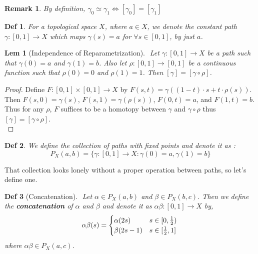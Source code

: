 \documentclass[paper=a4, fontsize=11pt]{scrartcl}
\newtheorem{definition}{Def}
\newtheorem{lemma}{Lem}
\newtheorem*{remark}{Remark}
\begin{document}
\begin{remark}
	By definition, $\gamma_0 \simeq \gamma_1 \iff [\gamma_0]=[\gamma_1]$\\
\end{remark}

\begin{definition}
	For a topological space $X$, where $a \in X$, we denote the constant path $\gamma:[0,1]\to X$ which maps $\gamma(s)=a$ for $\forall s \in [0,1]$, by just $a$.\\
\end{definition}

\begin{lemma}[Independence of Reparametrization] $ $\newline
	Let $\gamma:[0,1]\to X$ be a path such that $\gamma(0)=a$ and $\gamma(1)=b$. Also let $\rho:[0,1]\to [0,1]$ be a continuous function such that $\rho(0)=0$ and $\rho(1)=1$. Then $[\gamma]=[\gamma \circ \rho]$.\\
\end{lemma}

\begin{proof}
	Define $F:[0,1]\times[0,1] \to X$ by $F(s,t) = \gamma((1-t)\cdot s + t \cdot \rho(s))$. Then $F(s,0)=\gamma(s)$, $F(s,1)=\gamma(\rho(s))$, $F(0,t)=a$, and $F(1,t)=b$. Thus for any $\rho$, $F$ suffices to be a homotopy between $\gamma$ and $\gamma \circ \rho$ thus $[\gamma]=[\gamma \circ \rho]$.\\
\end{proof}

\begin{definition}
	We define the collection of paths with fixed points and denote it as :
	\begin{equation}\nonumber
			P_X (a,b)=\{\gamma:[0,1]\to X :\gamma(0)=a,\gamma(1)=b\}
	\end{equation}
\end{definition}
\vspace{0.15in}

That collection looks lonely without a proper operation between paths, so let's define one.\\

\begin{definition}[Concatenation]  $ $ \newline
	Let $\alpha \in P_X(a,b)$ and $\beta \in P_X(b,c)$. Then we define the \textbf{concatenation} of $\alpha$ and $\beta$ and denote it as $\alpha\beta : [0,1] \to X$ by,
	\begin{equation}\nonumber
		\alpha\beta(s) = 
		\begin{cases}
		\alpha(2s)  & s \in [0,\frac{1}{2})\\
		\beta(2s-1) & s \in [\frac{1}{2},1]
		\end{cases} \\
	\end{equation}
	where $\alpha\beta \in P_X(a,c)$.\\
\end{definition}
\end{document}
